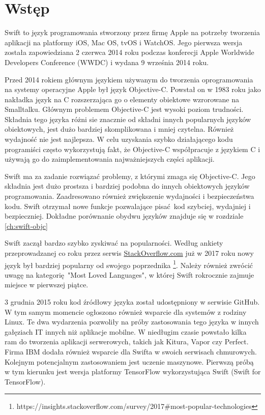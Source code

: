 \documentclass[mgr, shortabstract]{iithesis}
\author         {Maksymilian Debeściak}
\begin{document}

\chapter{Wstęp}
\label{ch:wstep}

Swift to język programowania stworzony przez firmę Apple na potrzeby tworzenia aplikacji na platformy iOS, Mac OS, tvOS i WatchOS. Jego pierwsza wersja została zapowiedziana 2 czerwca 2014 roku podczas konferecji Apple Worldwide Developers Conference (WWDC) i wydana 9 września 2014 roku.

Przed 2014 rokiem głównym językiem używanym do tworzenia oprogramowania na systemy operacyjne Apple był język Objective-C. Powstał on w 1983 roku jako nakładka język na C rozszerzająca go o elementy obiektowe wzrorowane na Smalltalku. Głównym problemem Objective-C jest wysoki poziom trudności. Składnia tego języka różni sie znacznie od składni innych popularnych języków obiektowych, jest dużo bardziej skomplikowana i mniej czytelna. Również wydajność nie jest najlepsza. W celu uzyskania szybko działającego kodu programiści często wykorzystują fakt, że Objective-C współpracuje z językiem C i używają go do zaimplementowania najważniejszych części aplikacji. 

Swift ma za zadanie rozwiązać problemy, z którymi zmaga się Objective-C. Jego składnia jest dużo prostsza i bardziej podobna do innych obiektowych języków programowania. Zaadresowano również zwiększenie wydajności i bezpieczeństwa kodu. Swift otrzymał nowe funkcje pozwalające pisać kod szybciej, wydajniej i bezpieczniej. Dokładne porównanie obydwu języków znajduje się w rozdziale \ref{ch:swift-objc}

Swift zaczął bardzo szybko zyskiwać na popularności. Według ankiety przeprowadzanej co roku przez serwis \url{StackOverflow.com} już w 2017 roku nowy język był bardziej popularny od swojego poprzednika \footnote{https://insights.stackoverflow.com/survey/2017\#most-popular-technologies}. Należy również zwrócić uwagę na kategorię "Most Loved Languages", w której Swift rokrocznie zajmuje miejsce w pierwszej piątce.

3 grudnia 2015 roku kod źródłowy języka został udostępniony w serwisie GitHub. W tym samym momencie ogłoszono również wsparcie dla systemów z rodziny Linux. Te dwa wydarzenia pozwoliły na próby zastosowania tego języka w innych gałęziach IT innych niż aplikacje mobilne. W niedługim czasie powstało kilka ram do tworzenia aplikacji serwerowych, takich jak Kitura, Vapor czy Perfect. Firma IBM dodała również wsparcie dla Swifta w swoich serwisach chmurowych. Kolejnym potencjalnym zastosowaniem jest uczenie maszynowe. Pierwszą próbą w tym kierunku jest wersja platformy TensorFlow wykorzystująca Swift (Swift for TensorFlow).
\end{document}
